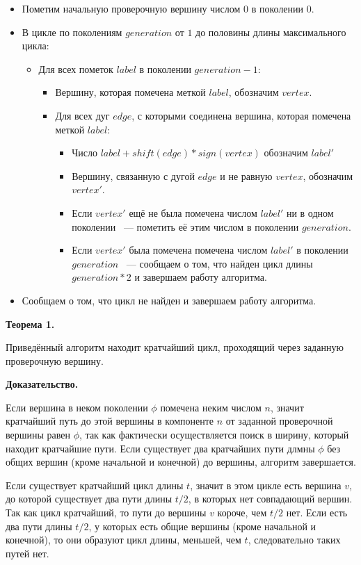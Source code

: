 \documentclass[14pt]{mmcs_article}
\begin{document}
\begin{itemize}
\item Пометим начальную проверочную вершину числом $0$ в поколении $0$.
\item В цикле по поколениям $generation$ от $1$ до половины длины максимального цикла:
  \begin{itemize}
  \item Для всех пометок $label$ в поколении $generation - 1$:
    \begin{itemize}
    \item Вершину, которая помечена меткой $label$, обозначим $vertex$.
    \item Для всех дуг $edge$, с которыми соединена вершина, которая помечена меткой $label$:
      \begin{itemize}
      \item Число $label + shift(edge) * sign(vertex)$ обозначим $label'$
      \item Вершину, связанную с дугой $edge$ и не равную $vertex$, обозначим $vertex'$.
      \item Если $vertex'$ ещё не была помечена числом $label'$ ни в одном поколении ~--- пометить её этим числом в поколении $generation$.
      \item Если $vertex'$ была помечена помечена числом  $label'$ в поколении $generation$ ~--- сообщаем о том, что найден цикл длины $generation * 2$ и завершаем работу алгоритма.
      \end{itemize}
    \end{itemize}
  \end{itemize}
  \item Сообщаем о том, что цикл не найден и завершаем работу алгоритма.
\end{itemize}


\textbf{Теорема 1.}

Приведённый алгоритм находит кратчайший цикл, проходящий через заданную проверочную вершину.

\textbf{Доказательство.}

Если вершина в неком поколении $\phi$ помечена неким числом $n$, значит кратчайший путь до этой вершины в компоненте $n$ от заданной проверочной вершины равен $\phi$, так как фактически осуществляется поиск в ширину, который находит кратчайшие пути. Если существует два кратчайших пути длмны $\phi$ без общих вершин (кроме начальной и конечной) до вершины, алгоритм завершается.

Если существует кратчайший цикл длины $t$, значит в этом цикле есть вершина $v$, до которой существует два пути длины $t / 2$, в которых нет совпадающий вершин. Так как цикл кратчайший, то пути до вершины $v$ короче, чем $t / 2$ нет. Если есть два пути длины $t / 2$, у которых есть общие вершины (кроме начальной и конечной), то они образуют цикл длины, меньшей, чем $t$, следовательно таких путей нет.
\end{document}
